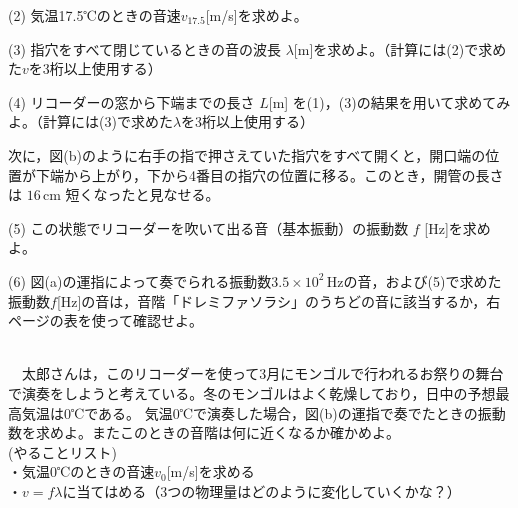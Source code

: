 \documentclass[a4paper,11pt]{ltjsarticle}
\begin{document}
(2) 気温17.5℃のときの音速$v_{17.5}$[m/s]を求めよ。

\vspace{3mm}

(3) 指穴をすべて閉じているときの音の波長 $\lambda$[m]を求めよ。（計算には(2)で求めた$v$を3桁以上使用する）

\vspace{3mm}

(4) リコーダーの窓から下端までの長さ $L$[m] を(1)，(3)の結果を用いて求めてみよ。（計算には(3)で求めた$\lambda$を3桁以上使用する）

\vspace{8mm}


次に，図(b)のように右手の指で押さえていた指穴をすべて開くと，開口端の位置が下端から上がり，下から4番目の指穴の位置に移る。このとき，開管の長さは $16\,\mathrm{cm}$ 短くなったと見なせる。


\vspace{3mm}

(5) この状態でリコーダーを吹いて出る音（基本振動）の振動数 $f$ [Hz]を求めよ。

\vspace{3mm}


(6) 図(a)の運指によって奏でられる振動数$3.5\times10^{2}\,\mathrm{Hz}$の音，および(5)で求めた振動数$f$[Hz]の音は，音階「ドレミファソラシ」のうちどの音に該当するか，右ページの表を使って確認せよ。


\clearpage

\\
　太郎さんは，このリコーダーを使って3月にモンゴルで行われるお祭りの舞台で演奏をしようと考えている。冬のモンゴルはよく乾燥しており，日中の予想最高気温は0℃である。
気温0℃で演奏した場合，図(b)の運指で奏でたときの振動数を求めよ。またこのときの音階は何に近くなるか確かめよ。\\
(やることリスト) \\
・気温0℃のときの音速$v_{0}$[m/s]を求める\\
・$v=f\lambda$に当てはめる（3つの物理量はどのように変化していくかな？）

\end{document}

